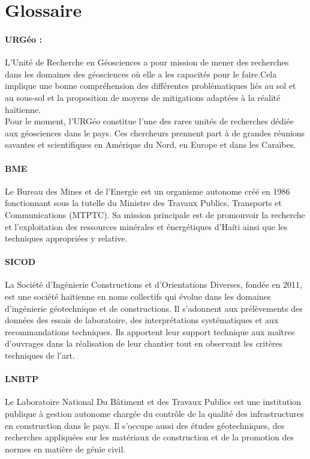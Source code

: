 \section{Glossaire}
\paragraph{URGéo :}
L'Unité de Recherche en Géosciences a pour mission de mener des
recherches dans les domaines des géosciences où elle a les capacités
pour le faire.Cela implique une bonne compréhension des différentes 
problématiques liés au sol et au sous-sol et la proposition de moyens
de mitigations adaptées à la réalité haïtienne.
\\
Pour le moment, l’URGéo constitue l’une des rares unités de recherches
dédiée aux géosciences dans le pays. Ces chercheurs prennent part à de
grandes réunions savantes et scientifiques en Amérique du Nord, en 
Europe et dans les Caraïbes.

\paragraph{BME}
Le Bureau des Mines et de l’Energie est un organisme autonome créé en 
1986 fonctionnant sous la tutelle du Ministre des Travaux Publics, Transports 
et Communications (MTPTC). Sa mission principale est de promouvoir la recherche
et l'exploitation des ressources minérales et énergétiques d'Haíti ainsi que les 
techniques appropriées y relative.

\paragraph{SICOD}
La  Société d’Ingénierie Constructions et d’Orientations Diverses,
fondée en 2011, est une société haïtienne en noms collectifs qui évolue dans 
les domaines d’ingénierie géotechnique et de constructions.
Il s'adonnent aux prélèvements des données des essais de laboratoire, des 
interprétations systématiques et aux recommandations techniques. 
Ils apportent leur support technique aux maîtres d'ouvrages dans la réalisation 
de leur chantier tout en observant les critères techniques de l'art.

\paragraph{LNBTP}
Le Laboratoire National Du Bâtiment et des Travaux Publics est une institution publique à gestion autonome chargée du contrôle de
la qualité des infrastructures en construction dans le pays. Il s'occupe 
aussi des études géotechniques, des recherches appliquées sur les matériaux de 
construction et de la promotion des normes en matière de génie civil.

